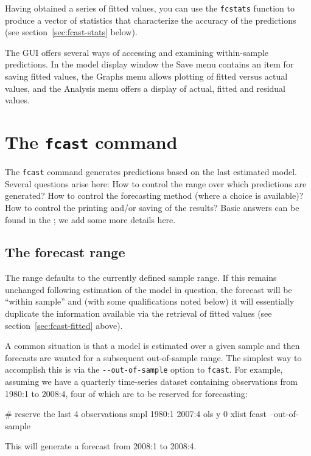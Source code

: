 Having obtained a series of fitted values, you can use the
\texttt{fcstats} function to produce a vector of statistics that
characterize the accuracy of the predictions (see
section~\ref{sec:fcast-stats} below).

The  GUI offers several ways of accessing and examining
within-sample predictions.  In the model display window the
\textsf{Save} menu contains an item for saving fitted values, the
\textsf{Graphs} menu allows plotting of fitted versus actual values,
and the \textsf{Analysis} menu offers a display of actual, fitted and
residual values.


\section{The \texttt{fcast} command}
\label{sec:fcast-fcast}

The \texttt{fcast} command generates predictions based on the last
estimated model.  Several questions arise here: How to control the
range over which predictions are generated?  How to control the
forecasting method (where a choice is available)?  How to control the
printing and/or saving of the results?  Basic answers can be found in
the \GCR; we add some more details here.

\subsection{The forecast range}

The range defaults to the currently defined sample range.  If this
remains unchanged following estimation of the model in question, the
forecast will be ``within sample'' and (with some qualifications noted
below) it will essentially duplicate the information available via the
retrieval of fitted values (see section~\ref{sec:fcast-fitted} above).

A common situation is that a model is estimated over a given sample
and then forecasts are wanted for a subsequent out-of-sample range.  The
simplest way to accomplish this is via the \verb|--out-of-sample|
option to \texttt{fcast}.  For example, assuming we have a quarterly
time-series dataset containing observations from 1980:1 to 2008:4,
four of which are to be reserved for forecasting:
%
\begin{code}
# reserve the last 4 observations
smpl 1980:1 2007:4
ols y 0 xlist
fcast --out-of-sample
\end{code}
%
This will generate a forecast from 2008:1 to 2008:4.

